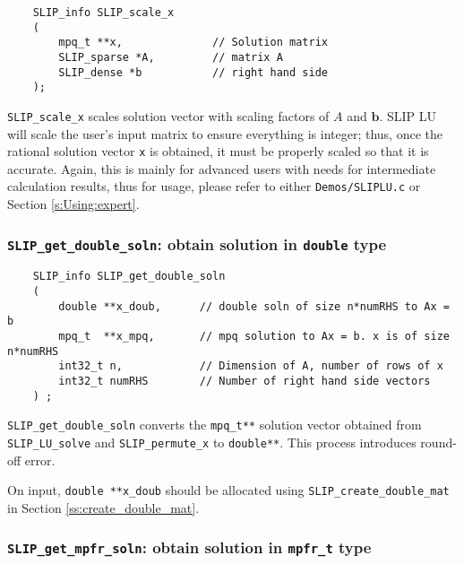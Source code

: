 \documentclass[12pt]{article}
\theoremstyle{definition}
\begin{document}
\begin{mdframed}[userdefinedwidth=6in]
{\footnotesize
\begin{verbatim}
    SLIP_info SLIP_scale_x
    (
        mpq_t **x,              // Solution matrix
        SLIP_sparse *A,         // matrix A
        SLIP_dense *b           // right hand side
    );
\end{verbatim}
} \end{mdframed}

\verb|SLIP_scale_x| scales solution vector with scaling factors of $A$ and
$\mathbf{b}$. SLIP LU will scale the user's input matrix to ensure everything
is integer; thus, once the rational solution vector \verb|x| is obtained, it
must be properly scaled so that it is accurate. Again, this is mainly for
advanced users with needs for intermediate calculation results, thus for usage,
please refer to either \verb|Demos/SLIPLU.c| or Section \ref{s:Using:expert}.

\cprotect\subsubsection{\verb|SLIP_get_double_soln|: obtain solution in \verb|double| type}
\label{ss:get_double_soln}

\begin{mdframed}[userdefinedwidth=6in]
{\footnotesize
\begin{verbatim}
    SLIP_info SLIP_get_double_soln
    (
        double **x_doub,      // double soln of size n*numRHS to Ax = b
        mpq_t  **x_mpq,       // mpq solution to Ax = b. x is of size n*numRHS
        int32_t n,            // Dimension of A, number of rows of x
        int32_t numRHS        // Number of right hand side vectors
    ) ;
\end{verbatim}
} \end{mdframed}

\verb|SLIP_get_double_soln| converts the \verb|mpq_t**| solution vector
obtained from \verb|SLIP_LU_solve| and \verb|SLIP_permute_x| to
\verb|double**|. This process introduces round-off error.

On input, \verb|double **x_doub| should be allocated using
\verb|SLIP_create_double_mat| in Section \ref{ss:create_double_mat}.

\cprotect\subsubsection{\verb|SLIP_get_mpfr_soln|: obtain solution in \verb|mpfr_t| type}
\label{ss:get_mpfr_soln}
\end{document}
